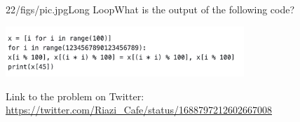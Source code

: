 \begin{problem}{22/figs/pic.jpg}{Long Loop}What is the output of the following code?

\begin{center}
	\includegraphics[width=9cm]{22/figs/22_code.png}
\end{center}

Link to the problem on Twitter:  \url{https://twitter.com/Riazi_Cafe/status/1688797212602667008}\end{problem}